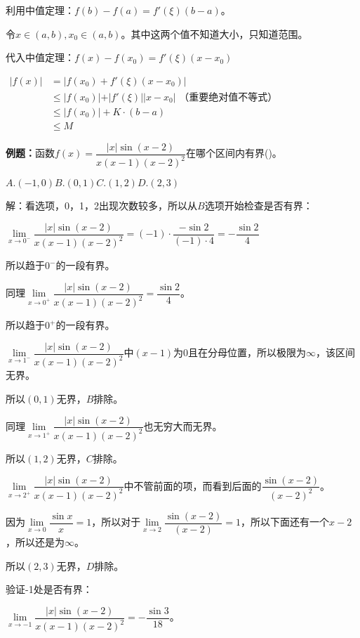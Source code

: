 \documentclass[UTF8, 12pt]{ctexart}
\begin{document}
利用中值定理：$f(b)-f(a)=f'(\xi)(b-a)$。

令$x\in(a,b),x_0\in(a,b)$。其中这两个值不知道大小，只知道范围。

代入中值定理：$f(x)-f(x_0)=f'(\xi)(x-x_0)$

$
\begin{aligned}
    \vert f(x)\vert & =\vert f(x_0)+f'(\xi)(x-x_0)\vert \\
    & \leqslant\vert f(x_0)\vert+\vert f'(\xi)\vert\vert x-x_0\vert\text{ （重要绝对值不等式）} \\
    & \leqslant\vert f(x_0)\vert+K\cdot(b-a) \\
    & \leqslant M
\end{aligned}
$

\textbf{例题：}函数$f(x)=\dfrac{\vert x\vert\sin(x-2)}{x(x-1)(x-2)^2}$在哪个区间内有界()。\medskip

$A.(-1,0)$\qquad$B.(0,1)$\qquad$C.(1,2)$\qquad$D.(2,3)$\medskip

解：看选项，0，1，2出现次数较多，所以从$B$选项开始检查是否有界：\medskip

$\lim\limits_{x\to 0^-}\dfrac{\vert x\vert\sin(x-2)}{x(x-1)(x-2)^2}=(-1)\cdot\dfrac{-\sin 2}{(-1)\cdot 4}=-\dfrac{\sin 2}{4}$\medskip

所以趋于$0^-$的一段有界。\medskip

同理$\lim\limits_{x\to 0^+}\dfrac{\vert x\vert\sin(x-2)}{x(x-1)(x-2)^2}=\dfrac{\sin 2}{4}$。\medskip

所以趋于$0^+$的一段有界。\medskip

$\lim\limits_{x\to 1^-}\dfrac{\vert x\vert\sin(x-2)}{x(x-1)(x-2)^2}$中$(x-1)$为0且在分母位置，所以极限为$\infty$，该区间无界。\medskip

所以$(0,1)$无界，$B$排除。\medskip

同理$\lim\limits_{x\to 1^+}\dfrac{\vert x\vert\sin(x-2)}{x(x-1)(x-2)^2}$也无穷大而无界。\medskip

所以$(1,2)$无界，$C$排除。\medskip

$\lim\limits_{x\to 2^+}\dfrac{\vert x\vert\sin(x-2)}{x(x-1)(x-2)^2}$中不管前面的项，而看到后面的$\dfrac{\sin(x-2)}{(x-2)^2}$。\medskip

因为$\lim\limits_{x\to 0}\dfrac{\sin x}{x}=1$，所以对于$\lim\limits_{x\to 2}\dfrac{\sin(x-2)}{(x-2)}=1$，所以下面还有一个$x-2$，所以还是为$\infty$。

所以$(2,3)$无界，$D$排除。\medskip

验证-1处是否有界：\medskip

$\lim\limits_{x\to -1}\dfrac{\vert x\vert\sin(x-2)}{x(x-1)(x-2)^2}=-\dfrac{\sin 3}{18}$。\medskip
\end{document}

